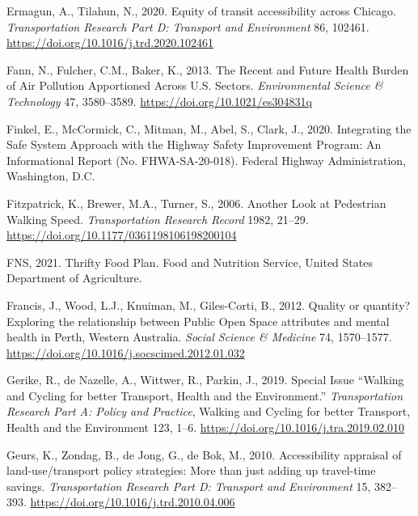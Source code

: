 \documentclass[
  letterpaper,
  DIV=11,
  numbers=noendperiod]{scrreport}
\newlength{\cslhangindent}
\newlength{\cslentryspacingunit} %
\newenvironment{CSLReferences}[2] %
 {%
  \setlength{\parindent}{0pt}
  \ifodd #1
  \let\oldpar\par
  \def\par{\hangindent=\cslhangindent\oldpar}
  \fi
  \setlength{\parskip}{#2\cslentryspacingunit}
 }%
 {}
\begin{document}
\begin{CSLReferences}{1}{0}
\leavevmode{}%
Ermagun, A., Tilahun, N., 2020. Equity of transit accessibility across
{Chicago}. \emph{Transportation Research Part D: Transport and
Environment} 86, 102461. \url{https://doi.org/10.1016/j.trd.2020.102461}

\leavevmode{}%
Fann, N., Fulcher, C.M., Baker, K., 2013. The {Recent} and {Future
Health Burden} of {Air Pollution Apportioned Across U}.{S}. {Sectors}.
\emph{Environmental Science \& Technology} 47, 3580--3589.
\url{https://doi.org/10.1021/es304831q}

\leavevmode{}%
Finkel, E., McCormick, C., Mitman, M., Abel, S., Clark, J., 2020.
Integrating the {Safe System Approach} with the {Highway Safety
Improvement Program}: {An Informational Report} (No. FHWA-SA-20-018).
{Federal Highway Administration}, {Washington, D.C}.

\leavevmode{}%
Fitzpatrick, K., Brewer, M.A., Turner, S., 2006. Another {Look} at
{Pedestrian Walking Speed}. \emph{Transportation Research Record} 1982,
21--29. \url{https://doi.org/10.1177/0361198106198200104}

\leavevmode{}%
FNS, 2021. Thrifty {Food Plan}. {Food and Nutrition Service, United
States Department of Agriculture}.

\leavevmode{}%
Francis, J., Wood, L.J., Knuiman, M., Giles-Corti, B., 2012. Quality or
quantity? {Exploring} the relationship between {Public Open Space}
attributes and mental health in {Perth}, {Western Australia}.
\emph{Social Science \& Medicine} 74, 1570--1577.
\url{https://doi.org/10.1016/j.socscimed.2012.01.032}

\leavevmode{}%
Gerike, R., de Nazelle, A., Wittwer, R., Parkin, J., 2019. Special
{Issue} {``{Walking} and {Cycling} for better {Transport}, {Health} and
the {Environment}.''} \emph{Transportation Research Part A: Policy and
Practice}, Walking and {Cycling} for better {Transport}, {Health} and
the {Environment} 123, 1--6.
\url{https://doi.org/10.1016/j.tra.2019.02.010}

\leavevmode{}%
Geurs, K., Zondag, B., de Jong, G., de Bok, M., 2010. Accessibility
appraisal of land-use/transport policy strategies: {More} than just
adding up travel-time savings. \emph{Transportation Research Part D:
Transport and Environment} 15, 382--393.
\url{https://doi.org/10.1016/j.trd.2010.04.006}


\end{CSLReferences}
\end{document}
